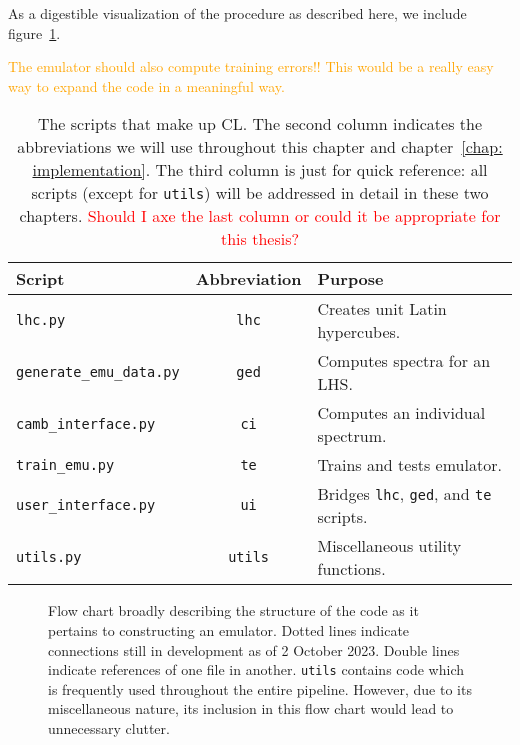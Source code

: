 As a digestible visualization of the procedure as described here, we
include figure~\ref{fig: flow_chart}.

\textcolor{orange}{The emulator should also compute training errors!! This
would be a really easy way to expand the code in a meaningful way.}

\begin{table}[ht!]
\centering
\begin{tabular}{l|c|l}
\hline
Script & Abbreviation & Purpose \\ \hline
\Verb|lhc.py| & \texttt{lhc} & Creates unit Latin hypercubes. \\
\Verb|generate_emu_data.py| & \texttt{ged} & Computes spectra for an LHS.\\
\Verb|camb_interface.py| & \texttt{ci} & Computes an individual spectrum. \\
\Verb|train_emu.py| & \texttt{te} & Trains and tests emulator. \\
\Verb|user_interface.py| & \texttt{ui} & Bridges
	\texttt{lhc}, \texttt{ged}, and \texttt{te} scripts. \\
\Verb|utils.py| & \texttt{utils} & Miscellaneous utility functions. 
\end{tabular}
 \cprotect\caption[Summary of CL Scripts]{The scripts that make up CL.
 	The second column indicates the abbreviations we will use throughout this 
 	chapter and chapter~\ref{chap: implementation}. The third column is just
 	for quick reference: all scripts (except for \texttt{utils}) will be
 	addressed in detail in these two chapters. \textcolor{red}{Should I axe
 	the last column or could it be appropriate for this thesis?}}
 \label{tab: script_summary}
\end{table}

\begin{figure}[ht!]
    \centering
 	
 	\caption[CL Flow Chart]{Flow chart broadly describing the structure
 		of the
 		code as it pertains to constructing an emulator. Dotted lines
 		indicate connections still in development as of 2 October 2023.
 		Double lines indicate references of one file in another.
 		\Verb|utils| contains code which is frequently used throughout
 		the entire pipeline. However, due to its miscellaneous nature, its
 		inclusion in this flow chart would lead to unnecessary clutter.}
 	\label{fig: flow_chart}
\end{figure}

